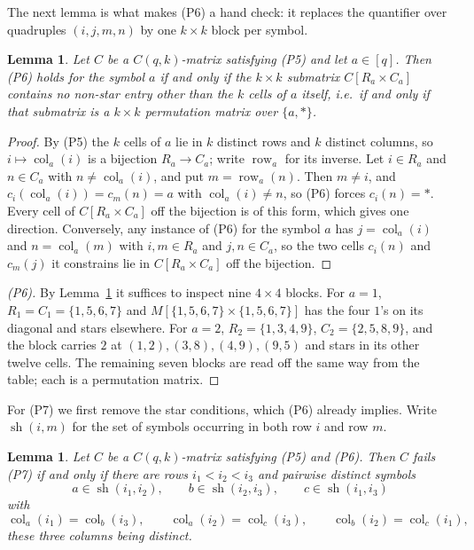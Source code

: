 \documentclass[11pt]{amsart}
\newtheorem{lemma}[theorem]{Lemma}
\theoremstyle{definition}
\theoremstyle{remark}
\DeclareMathOperator{\col}{col}
\DeclareMathOperator{\row}{row}
\newcommand{\sh}{\operatorname{sh}}
\newcommand{\st}{\ast}
\begin{document}
The next lemma is what makes (P6) a hand check: it replaces the quantifier over
quadruples $(i,j,m,n)$ by one $k\times k$ block per symbol.

\begin{lemma}\label{lem:block}
Let $C$ be a $C(q,k)$-matrix satisfying \textup{(P5)} and let $a\in[q]$. Then
\textup{(P6)} holds for the symbol $a$ if and only if the $k\times k$ submatrix
$C[R_a\times C_a]$ contains no non-star entry other than the $k$ cells of $a$
itself, i.e.\ if and only if that submatrix is a $k\times k$ permutation matrix
over $\{a,\st\}$.
\end{lemma}

\begin{proof}
By (P5) the $k$ cells of $a$ lie in $k$ distinct rows and $k$ distinct columns,
so $i\mapsto\col_a(i)$ is a bijection $R_a\to C_a$; write $\row_a$ for its
inverse. Let $i\in R_a$ and $n\in C_a$ with $n\ne\col_a(i)$, and put
$m=\row_a(n)$. Then $m\ne i$, and $c_i(\col_a(i))=c_m(n)=a$ with
$\col_a(i)\ne n$, so (P6) forces $c_i(n)=\st$. Every cell of
$C[R_a\times C_a]$ off the bijection is of this form, which gives one
direction. Conversely, any instance of (P6) for the symbol $a$ has $j=\col_a(i)$
and $n=\col_a(m)$ with $i,m\in R_a$ and $j,n\in C_a$, so the two cells
$c_i(n)$ and $c_m(j)$ it constrains lie in $C[R_a\times C_a]$ off the
bijection.
\end{proof}

\begin{proof}[(P6)]
By Lemma~\ref{lem:block} it suffices to inspect nine $4\times4$ blocks. For
$a=1$, $R_1=C_1=\{1,5,6,7\}$ and
$M[\{1,5,6,7\}\times\{1,5,6,7\}]$ has the four $1$'s on its diagonal and stars
elsewhere. For $a=2$, $R_2=\{1,3,4,9\}$, $C_2=\{2,5,8,9\}$, and the block
carries $2$ at $(1,2),(3,8),(4,9),(9,5)$ and stars in its other twelve cells.
The remaining seven blocks are read off the same way from the table; each is a
permutation matrix.
\end{proof}

For (P7) we first remove the star conditions, which (P6) already implies. Write
$\sh(i,m)$ for the set of symbols occurring in both row $i$ and row $m$.

\begin{lemma}\label{lem:red}
Let $C$ be a $C(q,k)$-matrix satisfying \textup{(P5)} and \textup{(P6)}. Then
$C$ fails \textup{(P7)} if and only if there are rows $i_1<i_2<i_3$ and
pairwise distinct symbols
\[
a\in\sh(i_1,i_2),\qquad b\in\sh(i_2,i_3),\qquad c\in\sh(i_1,i_3)
\]
with
\begin{equation}\label{eq:cols}
\col_a(i_1)=\col_b(i_3),\qquad
\col_a(i_2)=\col_c(i_3),\qquad
\col_b(i_2)=\col_c(i_1),
\end{equation}
these three columns being distinct.
\end{lemma}
\end{document}
